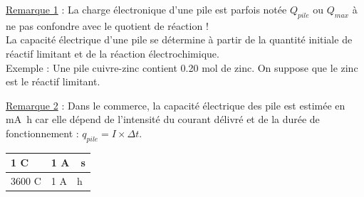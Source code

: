 \documentclass[a4paper,11pt,fleqn]{article}%
\begin{document}
	\underline{Remarque 1} : La charge électronique d'une pile  est parfois notée $Q_{pile}$ ou $Q_{max}$ à ne pas confondre avec le quotient de réaction !\\
	La capacité électrique d'une pile se détermine à partir de la quantité initiale de réactif limitant et de la réaction électrochimique.\\
	Exemple : Une pile cuivre-zinc contient \num{0,20} \unit{\mole} de zinc. On suppose que le zinc est le réactif limitant.
	\vspace{3cm}
	
	\underline{Remarque 2} : Dans le commerce, la capacité électrique des pile est estimée en \unit{\milli\ampere\hour} car elle dépend de l'intensité du courant délivré et de la durée de fonctionnement : $q_{pile} = I \times \Delta t$.\\
	\begin{tabular}{|l|l|}
	\hline \num{1} \unit{\coulomb} & \num{1} \unit{\ampere \cdot \second}\\
	\hline \num{3600} \unit{\coulomb}& \num{1} \unit{\ampere \cdot \hour}\\
	\hline
	\end{tabular}
\end{document}
